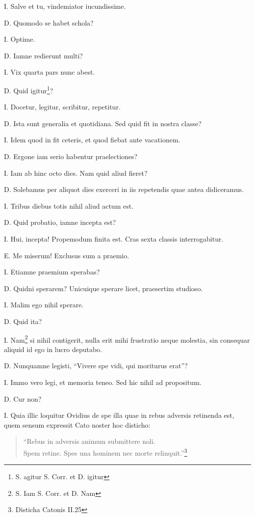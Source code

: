 \documentclass{article}
\begin{document}
I. Salve et tu, vindemiator iucundissime.

D. Quomodo se habet schola?

I. Optime.

D. Iamne redierunt multi?

I. Vix quarta pars nunc abest.

D. Quid igitur\footnote{S. agitur S. Corr. et  D. igitur}?

I. Docetur, legitur, scribitur, repetitur.

D. Ista sunt generalia et quotidiana. Sed quid fit in nostra classe?

I. Idem quod in fit ceteris, et quod fiebat ante vacationem.

D. Ergone iam serio habentur praelectiones?

I. Iam ab hinc octo dies. Nam quid aliud fieret?

D. Solebamus per aliquot dies exerceri in iis repetendis quae antea didiceramus.

I. Tribus diebus totis nihil aliud actum est.

D. Quid probatio, iamne incepta est?

I. Hui, incepta! Propemodum finita est. Cras sexta classis interrogabitur.

E. Me miserum! Exclusus sum a praemio.

I. Etiamne praemium sperabas?

D. Quidni sperarem? Unicuique sperare licet, praesertim studioso.

I. Malim ego nihil sperare.

D. Quid ita?

I. Nam\footnote{S. Iam S. Corr. et  D. Nam} si nihil contigerit, nulla erit mihi frustratio neque molestia, sin consequar aliquid id ego in lucro deputabo.

D. Nunquamne legisti, ``Vivere spe vidi, qui moriturus erat''?

I. Immo vero legi, et memoria teneo. Sed hic nihil ad propositum.

D. Cur non?

I. Quia illic loquitur Ovidius de spe illa quae in rebus adversis retinenda est, quem sensum expressit Cato noster hoc disticho: \begin{verse} ``Rebus in adversis animum submittere noli. \\ Spem retine. Spes una hominem nec morte relinquit.''\footnote{Disticha Catonis II.25}\end{verse}
\end{document}
